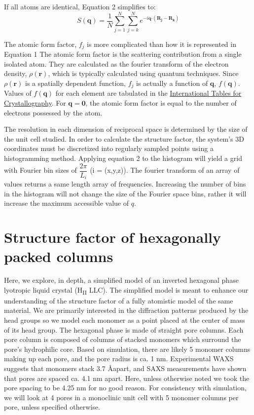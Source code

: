 \documentclass{article}
\begin{document}
  If all atoms are identical, Equation 2 %
  simplifies to:
  \begin{equation}\label{eqn:simplified_sf}
  S(\mathbf{q})= \dfrac{1}{N}\sum_{j=1}^{N}\sum_{j=k}^{N}e^{-i\mathbf{q}\boldsymbol{\cdot}(\mathbf{R_j}- \mathbf{R_k})}
  \end{equation}

  The atomic form factor, $f_j$ is more complicated than how it is represented
  in Equation 1 %
  The atomic form factor is the scattering
  contribution from a single isolated atom. They are calculated as the fourier
  transform of the electron density, $\rho({\mathbf{r}})$,  which is typically
  calculated using quantum techniques. Since $\rho({\mathbf{r}})$ is a spatially
  dependent function, $f_j$ is actually a function of $\mathbf{q}$,
  $f(\mathbf{q})$. Values of $f(\mathbf{q})$ for each element are tabulated in
  the \href{http://it.iucr.org/Cb/ch6o1v0001/}{International Tables for
  Crystallography}. For $\mathbf{q}=\mathbf{0}$, the atomic form factor is equal to the 
  number of electrons possessed by the atom. 

  The resolution in each dimension of reciprocal space is determined by the
  size of the unit cell studied. In order to calculate the structure factor, the
  system's 3D coordinates must be discretized into regularly sampled points using
  a histogramming method. Applying equation 2 %
  to the histogram
  will yield a grid with Fourier bin sizes of $\dfrac{2\pi}{L_i}$ (i = (x,y,z)).
  The fourier transform of an array of values returns a same length array of
  frequencies. Increasing the number of bins in the histogram will not change the
  size of the Fourier space bins, rather it will increase the maximum accessible
  value of $q$. 

  \section{Structure factor of hexagonally packed columns}

  Here, we explore, in depth, a simplified model of an inverted hexagonal phase
  lyotropic liquid crystal (H\textsubscript{II} LLC). The simplified model is
  meant to enhance our understanding of the structure factor of a fully atomistic
  model of the same material. We are primarily interested in the diffraction
  patterns produced by the head groups so we model each monomer as a point placed
  at the center of mass of its head group. The hexagonal phase is made of
  straight pore columns. Each pore column is composed of columns of stacked
  monomers which surround the pore's hydrophilic core. Based on simulation, there
  are likely 5 monomer columns making up each pore, and the pore radius is ca. 1
  nm. Experimental WAXS suggests that monomers stack 3.7 \AA apart, and SAXS
  measurements have shown that pores are spaced ca. 4.1 nm apart. Here, unless
  otherwise noted we took the pore spacing to be 4.25 nm for no good reason. For
  consistency with simulation, we will look at 4 pores in a monoclinic unit cell
  with 5 monomer columns per pore, unless specified otherwise. 
\end{document}
